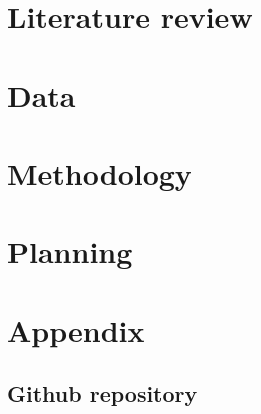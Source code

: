 \documentclass[a4paper,11pt]{article}
\begin{document}
\section{Literature review}
	
\section{Data}
	
\section{Methodology}
    
\section{Planning}



\newpage
 
 

\newpage
\appendix
\section{Appendix}
\subsection{Github repository}
\end{document}
